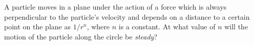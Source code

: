 \item A particle moves in a plane under the action of a force which is always perpendicular to the particle's velocity and depends on a distance to a certain point on the plane as \( 1/r^n \), where \( n \) is a constant. At what value of \( n \) will the motion of the particle along the circle be \textit{steady}?